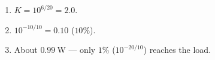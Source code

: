 \begin{enumerate}[leftmargin=1.6em,itemsep=2pt]
\item $K = 10^{6/20} = 2.0$.
\item $10^{-10/10} = 0.10$ ($10\%$).
\item About $0.99\ \text{W}$ --- only $1\%$ ($10^{-20/10}$) reaches the load.
\end{enumerate}

